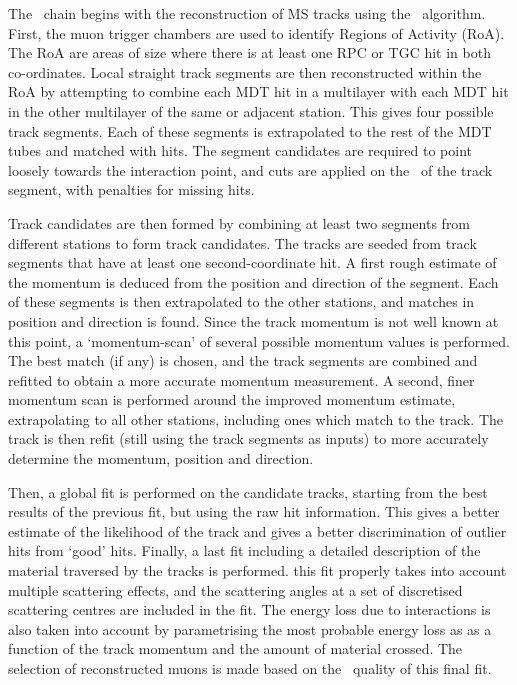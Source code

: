 The \staco\ chain begins with the reconstruction of MS tracks using the \muonboy\
algorithm. First, the muon trigger chambers are used to identify Regions of
Activity (RoA). The RoA are areas of size \deltaetadeltaphi{0.4}{0.4} where
there is at least one RPC or TGC hit in both co-ordinates. Local straight track
segments are then reconstructed within the RoA by attempting to combine each MDT
hit in a multilayer with each MDT hit in the other multilayer of the same or
adjacent station. This gives four possible track segments. Each of these segments
is extrapolated to the rest of the MDT tubes and matched with hits. The segment candidates are required to point loosely towards the
interaction point, and cuts are applied on the \chisquared\ of the track
segment, with penalties for missing hits. 

Track candidates are then formed by combining at least
two segments from different stations to form track candidates. The tracks are
seeded from track segments that have at least one second-coordinate hit. A first
rough estimate of the momentum is deduced from the position and direction of the
segment. Each of these segments is then extrapolated to the other stations, and
matches in position and direction is found. Since the track momentum is not well
known at this point, a `momentum-scan' of several possible momentum values is
performed. The best match (if any) is chosen, and the track segments are
combined and refitted to obtain a more accurate momentum measurement. A second,
finer momentum scan is performed around the improved momentum estimate,
extrapolating to all other stations, including ones which match to the track.
The track is then refit (still using the track segments as inputs) to more accurately determine the momentum, position and
direction. 

Then, a global fit is performed on the candidate tracks, starting from the
best results of the previous fit, but using the raw hit information. This gives
a better estimate of the likelihood of the track and gives a better
discrimination of outlier hits from `good' hits. Finally, a last fit including
a detailed description of the material traversed by the tracks is performed.
this fit properly takes into account multiple scattering effects, and the
scattering angles at a set of discretised scattering centres are included in the
fit. The energy loss due to interactions is also taken into account  by
parametrising the most probable energy loss as as a function of the track momentum and
the amount of material crossed. The selection of reconstructed muons is made
based on the \chisquared\ quality of this final fit.

